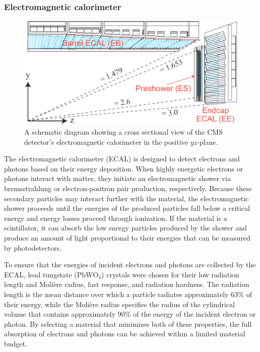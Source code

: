 \subsubsection{Electromagnetic calorimeter}

\begin{figure}[htbp]
  \centering
    \includegraphics[width=5.5in]{images/ecal_diagram}
    \caption[Schematic for the CMS ECAL]{A schematic diagram showing a cross sectional view of the CMS detector's electromagnetic calorimeter in the positive $yz$-plane.\cite{ECALDIAGRAM}}
    \label{fig:CMSecaldiag}
\end{figure}

The electromagnetic calorimeter (ECAL) is designed to detect electrons and photons based on their energy deposition. When highly energetic electrons or photons interact with matter, they initiate an electromagnetic shower via bremsstrahlung or electron-positron pair production, respectively. Because these secondary particles may interact further with the material, the electromagnetic shower proceeds until the energies of the produced particles fall below a critical energy and energy losses proceed through ionization. If the material is a scintillator, it can absorb the low energy particles produced by the shower and produce an amount of light proportional to their energies that can be measured by photodetectors.

To ensure that the energies of incident electrons and photons are collected by the ECAL, lead tungstate ($\mathrm{PbWO}_{4}$) crystals were chosen for their low radiation length and Moli{\`e}re radius, fast response, and radiation hardness. The radiation length is the mean distance over which a particle radiates approximately 63\% of their energy, while the Moli{\`e}re radius specifies the radius of the cylindrical volume that contains approximately 90\% of the energy of the incident electron or photon. By selecting a material that minimizes both of these properties, the full absorption of electrons and photons can be achieved within a limited material budget.

